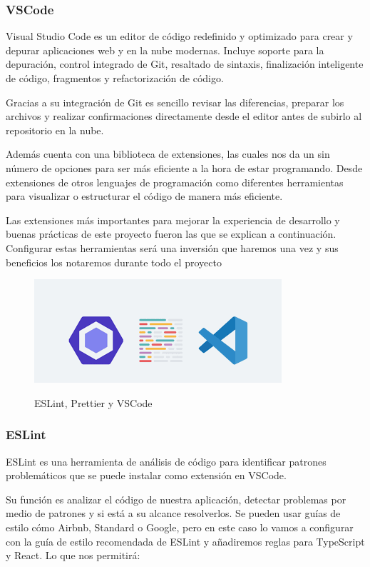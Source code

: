 \documentclass[12pt,twoside,titlepage]{report}
\begin{document}
\subsubsection{VSCode}

Visual Studio Code es un editor de código redefinido y optimizado para crear y depurar aplicaciones web y en la nube modernas. Incluye soporte para la depuración, control integrado de Git, resaltado de sintaxis, finalización inteligente de código, fragmentos y refactorización de código.

Gracias a su integración de Git es sencillo revisar las diferencias, preparar los archivos y realizar confirmaciones directamente desde el editor antes de subirlo al repositorio en la nube.

Además cuenta con una biblioteca de extensiones, las cuales nos da un sin número de opciones para ser más eficiente a la hora de estar programando. Desde extensiones de otros lenguajes de programación como diferentes herramientas para visualizar o estructurar el código de manera más eficiente.

Las extensiones más importantes para mejorar la experiencia de desarrollo y buenas prácticas de este proyecto fueron las que se explican a continuación. Configurar estas herramientas será una inversión que haremos una vez y sus beneficios los notaremos durante todo el proyecto

\begin{figure}[H]
    \centering
    \includegraphics[scale=0.8]{VScode_extensions}
    \label{fig:VScode_extensions}
    \caption{ESLint, Prettier y VSCode}
\end{figure}

\subsubsection{ESLint}

ESLint es una herramienta de análisis de código para identificar patrones problemáticos que se puede instalar como extensión en VSCode.

Su función es analizar el código de nuestra aplicación, detectar problemas por medio de patrones y si está a su alcance resolverlos. Se pueden usar guías de estilo cómo Airbnb, Standard o Google, pero en este caso lo vamos a configurar con la guía de estilo recomendada de ESLint y añadiremos reglas para TypeScript y React. Lo que nos permitirá:
\end{document}

